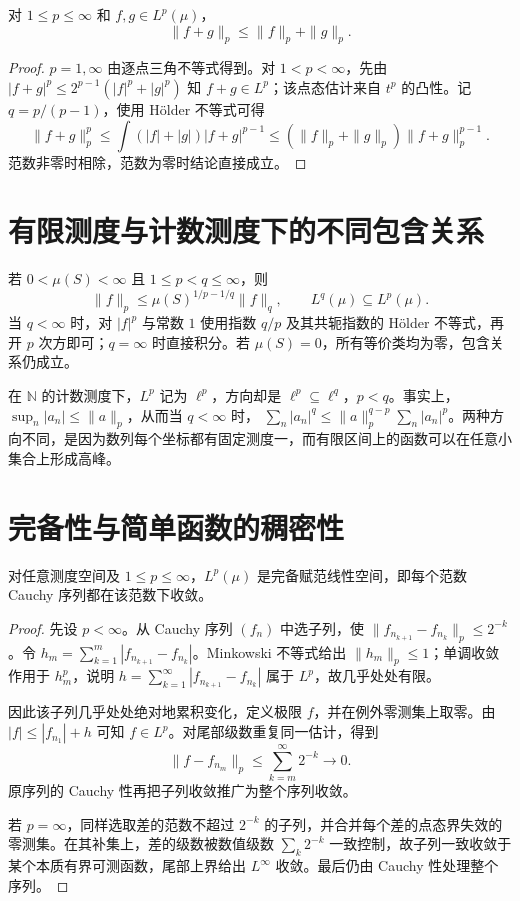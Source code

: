 \begin{theorem}
对 $1\leq p\leq\infty$ 和 $f,g\in L^p(\mu)$，
\begin{equation}
 \|f+g\|_p\leq\|f\|_p+\|g\|_p.
 \label{eq:mt-minkowski}
\end{equation}
\end{theorem}
\begin{proof}
$p=1,\infty$ 由逐点三角不等式得到。对 $1<p<\infty$，先由
$|f+g|^p\leq2^{p-1}(|f|^p+|g|^p)$ 知 $f+g\in L^p$；该点态估计来自 $t^p$ 的凸性。记 $q=p/(p-1)$，使用 Hölder 不等式可得
\[
 \|f+g\|_p^p
 \leq\int(|f|+|g|)|f+g|^{p-1}
 \leq(\|f\|_p+\|g\|_p)\|f+g\|_p^{p-1}.
\]
范数非零时相除，范数为零时结论直接成立。
\end{proof}

\section{有限测度与计数测度下的不同包含关系}
若 $0<\mu(S)<\infty$ 且 $1\leq p<q\leq\infty$，则
\begin{equation}
 \|f\|_p\leq\mu(S)^{1/p-1/q}\|f\|_q,\qquad L^q(\mu)\subseteq L^p(\mu).
 \label{eq:mt-finite-embedding}
\end{equation}
当 $q<\infty$ 时，对 $|f|^p$ 与常数 $1$ 使用指数 $q/p$ 及其共轭指数的 Hölder 不等式，再开 $p$ 次方即可；$q=\infty$ 时直接积分。若 $\mu(S)=0$，所有等价类均为零，包含关系仍成立。

在 $\mathbb N$ 的计数测度下，$L^p$ 记为 $\ell^p$，方向却是 $\ell^p\subseteq\ell^q$，$p<q$。事实上，$\sup_n|a_n|\leq\|a\|_p$，从而当 $q<\infty$ 时，
$\sum_n|a_n|^q\leq\|a\|_p^{q-p}\sum_n|a_n|^p$。两种方向不同，是因为数列每个坐标都有固定测度一，而有限区间上的函数可以在任意小集合上形成高峰。

\section{完备性与简单函数的稠密性}
\begin{theorem}[$L^p$ 的完备性]
对任意测度空间及 $1\leq p\leq\infty$，$L^p(\mu)$ 是完备赋范线性空间，即每个范数 Cauchy 序列都在该范数下收敛。
\label{thm:mt-lp-complete}
\end{theorem}
\begin{proof}
先设 $p<\infty$。从 Cauchy 序列 $(f_n)$ 中选子列，使 $\|f_{n_{k+1}}-f_{n_k}\|_p\leq2^{-k}$。令
$h_m=\sum_{k=1}^{m}|f_{n_{k+1}}-f_{n_k}|$。Minkowski 不等式给出 $\|h_m\|_p\leq1$；单调收敛作用于 $h_m^p$，说明 $h=\sum_{k=1}^{\infty}|f_{n_{k+1}}-f_{n_k}|$ 属于 $L^p$，故几乎处处有限。

因此该子列几乎处处绝对地累积变化，定义极限 $f$，并在例外零测集上取零。由 $|f|\leq|f_{n_1}|+h$ 可知 $f\in L^p$。对尾部级数重复同一估计，得到
\[
 \|f-f_{n_m}\|_p\leq\sum_{k=m}^{\infty}2^{-k}\longrightarrow0.
\]
原序列的 Cauchy 性再把子列收敛推广为整个序列收敛。

若 $p=\infty$，同样选取差的范数不超过 $2^{-k}$ 的子列，并合并每个差的点态界失效的零测集。在其补集上，差的级数被数值级数 $\sum_k2^{-k}$ 一致控制，故子列一致收敛于某个本质有界可测函数，尾部上界给出 $L^\infty$ 收敛。最后仍由 Cauchy 性处理整个序列。
\end{proof}

